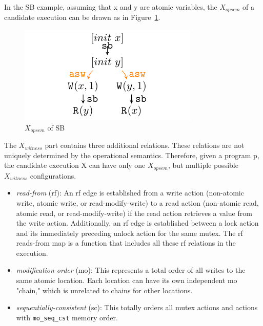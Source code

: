 In the SB example,  assuming that x and y are atomic variables, the $X_{opsem}$ of a candidate execution can be drawn as in Figure~\ref{XopsemSB}.

\begin{figure}[h!tbp] %
	\centering
	\includegraphics[scale=1.3]{figure/exec-graph/SB1.pdf} %
	\caption{$X_{opsem}$ of SB} %
	\label{XopsemSB} %
\end{figure}

The $X_{witness}$ part contains three additional relations. These relations are not uniquely determined by the operational semantics. Therefore, given a program p, the candidate execution X can have only one $X_{opsem}$, but multiple possible $X_{witness}$ configurations.



\begin{itemize}
	\item \textit{read-from} (rf): An rf edge is established from a write action (non-atomic write, atomic write, or read-modify-write) to a read action (non-atomic read, atomic read, or read-modify-write) if the read action retrieves a value from the write action. Additionally, an rf edge is established between a lock action and its immediately preceding unlock action for the same mutex. The rf reads-from map is a function that includes all these rf relations in the execution.
	\item \textit{modification-order} (mo): This represents a total order of all writes to the same atomic location. Each location can have its own independent mo "chain," which is unrelated to chains for other locations.
	\item \textit{sequentially-consistent} (sc): This totally orders all mutex actions and actions with \texttt{mo\_seq\_cst} memory order.
\end{itemize}


